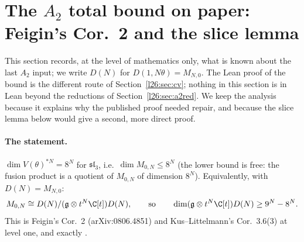 \section[The $A_2$ total bound on paper]{The $A_2$ total bound on paper: Feigin's Cor.~2 and the slice lemma}\label{l26:sec:open}

This section records, at the level of mathematics only, what is known about the last $A_2$ input; we write $D(N)$ for
$D(1,N\theta)=M_{N,0}$. The Lean proof of the bound is the different route of Section~\ref{l26:sec:cv}; nothing in this
section is in Lean beyond the reductions of Section~\ref{l26:sec:a2red}. We keep the analysis because it explains why the
published proof needed repair, and because the slice lemma below would give a second, more direct proof.

\paragraph{The statement.} $\dim V(\theta)^{*N}=8^N$ for $\mathfrak{sl}_3$, i.e.\ $\dim M_{0,N}\le8^N$ (the lower bound is
free: the fusion product is a quotient of $M_{0,N}$ of dimension $8^N$). Equivalently, with $D(N)=M_{N,0}$:
\begin{equation*}
M_{0,N}\cong D(N)/(\ltwentysixg\otimes t^N\C[t])D(N),\qquad\text{so}\qquad \dim(\ltwentysixg\otimes t^N\C[t])D(N)\ge9^N-8^N .
\end{equation*}
This is Feigin's Cor.~2 (arXiv:0806.4851) and Kus--Littelmann's Cor.~3.6(3) at level one, and exactly .


